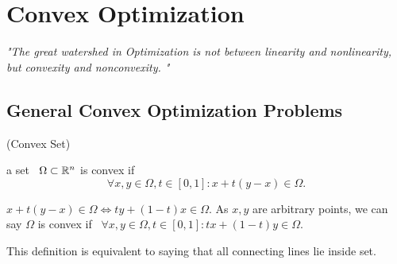 \chapter{Convex Optimization}\label{chp:Convex Optimization}


\textit{"The great watershed in Optimization is not 
between linearity and nonlinearity, but convexity and nonconvexity. "}

\section{General Convex Optimization Problems}
\begin{definition}{
    (Convex Set) %
  }{%
  }
    {
        a set \ $\Omega\subset \mathbb{R}^n$ is convex if 
         \begin{equation}
            \forall x,y \in \Omega, t\in [0,1]: x+t(y-x)\in \Omega. 
         \end{equation}


        
    }
\end{definition}

\begin{remark}
    $x+t(y-x)\in \Omega \Longleftrightarrow 
    ty + (1-t)x\in \Omega$. As $x,y$ are arbitrary points, we can say $\Omega$ is convex if
    \ $\forall x,y \in \Omega,t\in [0,1]: tx + (1-t)y\in \Omega$. 
\end{remark}

\begin{remark}
    This definition is equivalent to saying that
    all connecting lines lie inside set. 
\end{remark}

